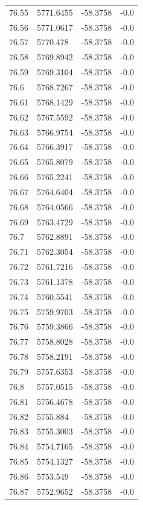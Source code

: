 \begin{table}[H]
\begin{tabular}{llll}
76.55 & 5771.6455 & -58.3758 & -0.0 \\
76.56 & 5771.0617 & -58.3758 & -0.0 \\
76.57 & 5770.478 & -58.3758 & -0.0 \\
76.58 & 5769.8942 & -58.3758 & -0.0 \\
76.59 & 5769.3104 & -58.3758 & -0.0 \\
76.6 & 5768.7267 & -58.3758 & -0.0 \\
76.61 & 5768.1429 & -58.3758 & -0.0 \\
76.62 & 5767.5592 & -58.3758 & -0.0 \\
76.63 & 5766.9754 & -58.3758 & -0.0 \\
76.64 & 5766.3917 & -58.3758 & -0.0 \\
76.65 & 5765.8079 & -58.3758 & -0.0 \\
76.66 & 5765.2241 & -58.3758 & -0.0 \\
76.67 & 5764.6404 & -58.3758 & -0.0 \\
76.68 & 5764.0566 & -58.3758 & -0.0 \\
76.69 & 5763.4729 & -58.3758 & -0.0 \\
76.7 & 5762.8891 & -58.3758 & -0.0 \\
76.71 & 5762.3054 & -58.3758 & -0.0 \\
76.72 & 5761.7216 & -58.3758 & -0.0 \\
76.73 & 5761.1378 & -58.3758 & -0.0 \\
76.74 & 5760.5541 & -58.3758 & -0.0 \\
76.75 & 5759.9703 & -58.3758 & -0.0 \\
76.76 & 5759.3866 & -58.3758 & -0.0 \\
76.77 & 5758.8028 & -58.3758 & -0.0 \\
76.78 & 5758.2191 & -58.3758 & -0.0 \\
76.79 & 5757.6353 & -58.3758 & -0.0 \\
76.8 & 5757.0515 & -58.3758 & -0.0 \\
76.81 & 5756.4678 & -58.3758 & -0.0 \\
76.82 & 5755.884 & -58.3758 & -0.0 \\
76.83 & 5755.3003 & -58.3758 & -0.0 \\
76.84 & 5754.7165 & -58.3758 & -0.0 \\
76.85 & 5754.1327 & -58.3758 & -0.0 \\
76.86 & 5753.549 & -58.3758 & -0.0 \\
76.87 & 5752.9652 & -58.3758 & -0.0 \\

\end{tabular}
\end{table}

